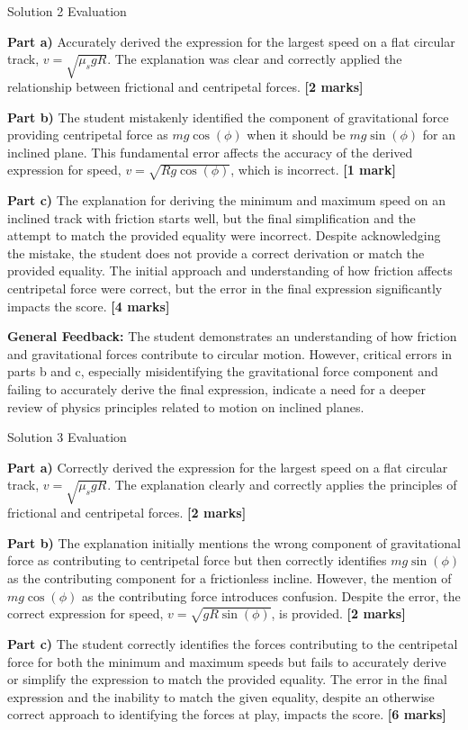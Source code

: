 \documentclass[a4paper,11pt]{article}
\begin{document}
Solution 2 Evaluation

\textbf{Part a)} Accurately derived the expression for the largest speed on a flat circular track, \(v = \sqrt{\mu_s g R}\). The explanation was clear and correctly applied the relationship between frictional and centripetal forces. \textbf{[2 marks]}

\textbf{Part b)} The student mistakenly identified the component of gravitational force providing centripetal force as \(mg\cos(\phi)\) when it should be \(mg\sin(\phi)\) for an inclined plane. This fundamental error affects the accuracy of the derived expression for speed, \(v = \sqrt{Rg\cos(\phi)}\), which is incorrect. \textbf{[1 mark]}

\textbf{Part c)} The explanation for deriving the minimum and maximum speed on an inclined track with friction starts well, but the final simplification and the attempt to match the provided equality were incorrect. Despite acknowledging the mistake, the student does not provide a correct derivation or match the provided equality. The initial approach and understanding of how friction affects centripetal force were correct, but the error in the final expression significantly impacts the score. \textbf{[4 marks]}

\textbf{General Feedback:} The student demonstrates an understanding of how friction and gravitational forces contribute to circular motion. However, critical errors in parts b and c, especially misidentifying the gravitational force component and failing to accurately derive the final expression, indicate a need for a deeper review of physics principles related to motion on inclined planes.

Solution 3 Evaluation

\textbf{Part a)} Correctly derived the expression for the largest speed on a flat circular track, \(v = \sqrt{\mu_s g R}\). The explanation clearly and correctly applies the principles of frictional and centripetal forces. \textbf{[2 marks]}

\textbf{Part b)} The explanation initially mentions the wrong component of gravitational force as contributing to centripetal force but then correctly identifies \(mg \sin(\phi)\) as the contributing component for a frictionless incline. However, the mention of \(mg \cos(\phi)\) as the contributing force introduces confusion. Despite the error, the correct expression for speed, \(v = \sqrt{g R \sin(\phi)}\), is provided. \textbf{[2 marks]}

\textbf{Part c)} The student correctly identifies the forces contributing to the centripetal force for both the minimum and maximum speeds but fails to accurately derive or simplify the expression to match the provided equality. The error in the final expression and the inability to match the given equality, despite an otherwise correct approach to identifying the forces at play, impacts the score. \textbf{[6 marks]}
\end{document}
